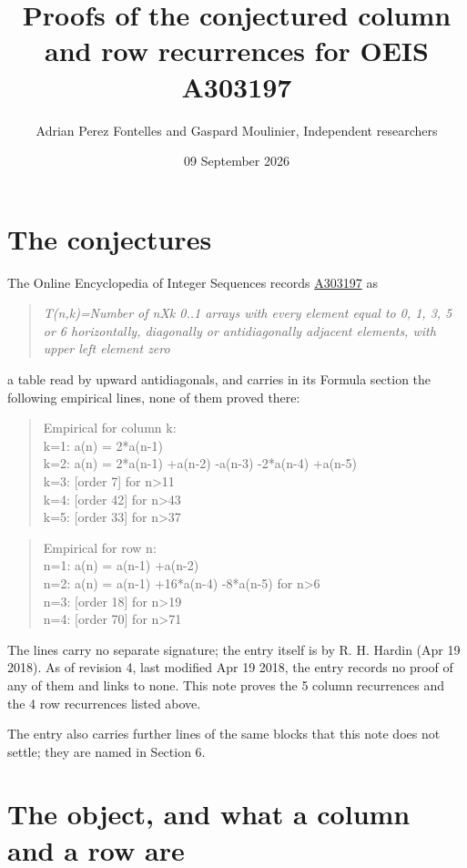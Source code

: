 \documentclass[11pt]{article}
\title{Proofs of the conjectured column and row recurrences for OEIS A303197}
\author{Adrian Perez Fontelles and Gaspard Moulinier, Independent researchers}
\date{09 September 2026}
\theoremstyle{definition}
\begin{document}
\maketitle
\section{The conjectures}

The Online Encyclopedia of Integer Sequences records \href{https://oeis.org/A303197}{A303197} as

\begin{quote}\itshape T(n,k)=Number of nXk 0..1 arrays with every element equal to 0, 1, 3, 5 or 6 horizontally, diagonally or antidiagonally adjacent elements, with upper left element zero\end{quote}

a table read by upward antidiagonals, and carries in its Formula section the following empirical lines, none of them proved there:

\begin{quote}\ttfamily Empirical for column k:\\
k=1: a(n) = 2*a(n-1)\\k=2: a(n) = 2*a(n-1) +a(n-2) -a(n-3) -2*a(n-4) +a(n-5)\\k=3: [order 7] for n>11\\k=4: [order 42] for n>43\\k=5: [order 33] for n>37\end{quote}

\begin{quote}\ttfamily Empirical for row n:\\
n=1: a(n) = a(n-1) +a(n-2)\\n=2: a(n) = a(n-1) +16*a(n-4) -8*a(n-5) for n>6\\n=3: [order 18] for n>19\\n=4: [order 70] for n>71\end{quote}

The lines carry no separate signature; the entry itself is by R. H. Hardin (Apr 19 2018). As of revision 4, last modified Apr 19 2018, the entry records no proof of any of them and links to none. This note proves the 5 column recurrences and the 4 row recurrences listed above.

The entry also carries further lines of the same blocks that this note does not settle; they are named in Section 6.

\section{The object, and what a column and a row are}
\end{document}
